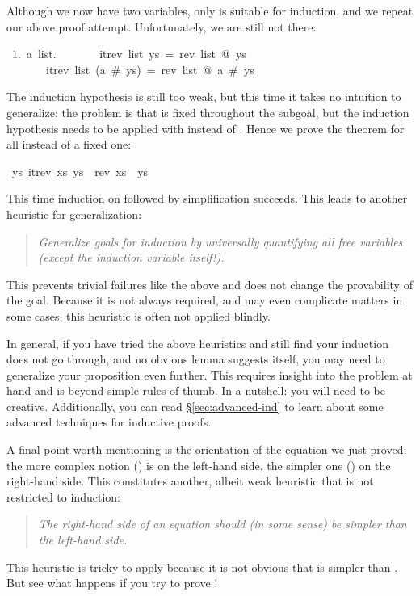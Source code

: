 \begin{isabellebody}
\begin{isamarkuptxt}
Although we now have two variables, only  is suitable for
induction, and we repeat our above proof attempt. Unfortunately, we are still
not there:
\begin{isabelle}\makeatother
~1.~{\isasymAnd}a~list.\isanewline
~~~~~~~itrev~list~ys~=~rev~list~@~ys~{\isasymLongrightarrow}\isanewline
~~~~~~~itrev~list~(a~\#~ys)~=~rev~list~@~a~\#~ys
\end{isabelle}
The induction hypothesis is still too weak, but this time it takes no
intuition to generalize: the problem is that  is fixed throughout
the subgoal, but the induction hypothesis needs to be applied with
 instead of . Hence we prove the theorem
for all  instead of a fixed one:%
\end{isamarkuptxt}%
\ {\isachardoublequote}{\isasymforall}ys{\isachardot}\ itrev\ xs\ ys\ {\isacharequal}\ rev\ xs\ {\isacharat}\ ys{\isachardoublequote}%
\begin{isamarkuptext}%
\noindent
This time induction on  followed by simplification succeeds. This
leads to another heuristic for generalization:
\begin{quote}
\emph{Generalize goals for induction by universally quantifying all free
variables {\em(except the induction variable itself!)}.}
\end{quote}
This prevents trivial failures like the above and does not change the
provability of the goal. Because it is not always required, and may even
complicate matters in some cases, this heuristic is often not
applied blindly.

In general, if you have tried the above heuristics and still find your
induction does not go through, and no obvious lemma suggests itself, you may
need to generalize your proposition even further. This requires insight into
the problem at hand and is beyond simple rules of thumb. In a nutshell: you
will need to be creative. Additionally, you can read \S\ref{sec:advanced-ind}
to learn about some advanced techniques for inductive proofs.

A final point worth mentioning is the orientation of the equation we just
proved: the more complex notion () is on the left-hand
side, the simpler one () on the right-hand side. This constitutes
another, albeit weak heuristic that is not restricted to induction:
\begin{quote}
  \emph{The right-hand side of an equation should (in some sense) be simpler
    than the left-hand side.}
\end{quote}
This heuristic is tricky to apply because it is not obvious that
 is simpler than . But see what
happens if you try to prove !%
\end{isamarkuptext}%
\end{isabellebody}%
